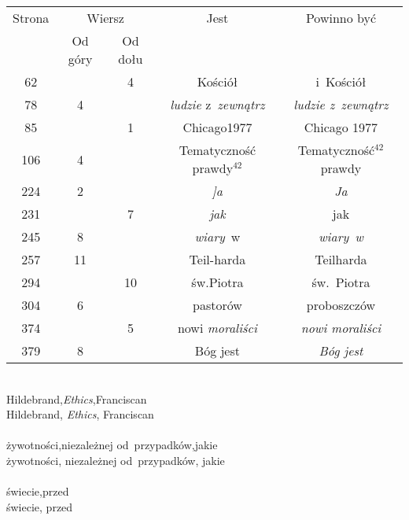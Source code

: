 \documentclass[a4paper,11pt]{article}
\begin{document}
\begin{center}

  \begin{tabular}{|c|c|c|c|c|}
    \hline
    Strona & \multicolumn{2}{c|}{Wiersz} & Jest
                              & Powinno być \\ \cline{2-3}
    & Od góry & Od dołu & & \\
    \hline
    \hphantom{0}62 & & \hphantom{0}4 & Kościół & i~Kościół \\
    \hphantom{0}78 & \hphantom{0}4 & & \textit{ludzie} z~\textit{zewnątrz}
           & \textit{ludzie z~zewnątrz} \\
    \hphantom{0}85 & & \hphantom{0}1 & Chicago1977 & Chicago 1977 \\
    106 &  4 & & Tematyczność prawdy$^{ 42 }$
           & Tematyczność$^{ 42 }$ prawdy \\
    224 &  2 & & \textit{]a} & \textit{Ja} \\
    231 & &  7 & \textit{jak} & jak \\
    245 &  8 & & \textit{wiary}~w & \textit{wiary~w} \\
    257 & 11 & & Teil-harda & Teilharda \\
    294 & & 10 & św.Piotra & św.~Piotra \\
    304 &  6 & & pastorów & proboszczów \\
    374 & &  5 & nowi \textit{moraliści} & \textit{nowi moraliści} \\
    379 &  8 & & Bóg jest & \textit{Bóg jest} \\
    \hline
  \end{tabular}

\end{center}

\vspace{\spaceTwo}


\noindent
{} \\
\Jest  Hildebrand,\textit{Ethics},Franciscan \\
\Powin Hildebrand, \textit{Ethics}, Franciscan \\
 \\
\Jest  żywotności,niezależnej od~przypadków,jakie \\
\Powin żywotności, niezależnej od~przypadków, jakie \\
 \\
\Jest  świecie,przed \\
\Powin świecie, przed \\
\end{document}
